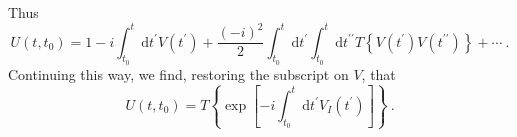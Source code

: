 \documentclass[11pt,a4paper]{article}
\newcommand{\dif}{\mathrm{d}}
\begin{document}
Thus 
\begin{equation}
U(t,t_0) = 1 -i\int_{t_0}^t \dif t^\prime V(t^\prime) + \dfrac{(-i)^2}{2} \int_{t_0}^t \dif t^\prime \int_{t_0}^t \dif t^{\prime\prime}  T\left\{V(t^\prime) V(t^{\prime\prime}) \right\}  +\cdots ~.
\end{equation}
Continuing this way, we find, restoring the subscript on $V$, that
\begin{equation}
U(t,t_0) = T\left\{\exp \left[-i \int_{t_0}^t \dif t^\prime V_I(t^\prime) \right] \right\} ~.
\end{equation}









































\end{document}
